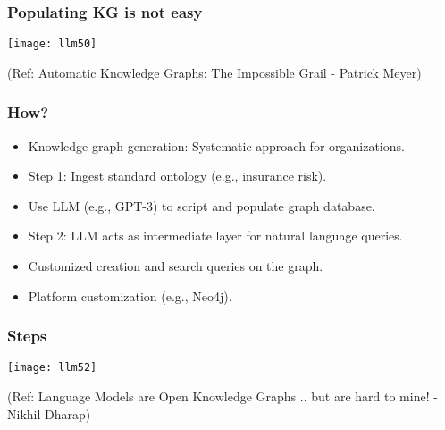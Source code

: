 \begin{frame}[fragile]\frametitle{Populating KG is not easy}

\begin{center}
\texttt{[image: llm50]}
\end{center}

{\tiny (Ref: Automatic Knowledge Graphs: The Impossible Grail - Patrick Meyer)}

\end{frame}

\begin{frame}[fragile]\frametitle{How?}

\begin{itemize}
\item Knowledge graph generation: Systematic approach for organizations.
\item Step 1: Ingest standard ontology (e.g., insurance risk).
\item Use LLM (e.g., GPT-3) to script and populate graph database.
\item Step 2: LLM acts as intermediate layer for natural language queries.
\item Customized creation and search queries on the graph.
\item Platform customization (e.g., Neo4j).
\end{itemize}
\end{frame}

\begin{frame}[fragile]\frametitle{Steps}

\begin{center}
\texttt{[image: llm52]}
\end{center}	

{\tiny (Ref: Language Models are Open Knowledge Graphs .. but are hard to mine! - Nikhil Dharap)}
\end{frame}



